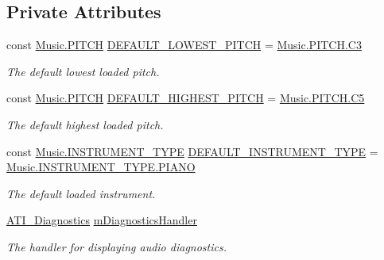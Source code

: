 \subsection*{Private Attributes}
\begin{DoxyCompactItemize}
\item 
const \hyperlink{group___music_enums_ga508f69b199ea518f935486c990edac1d}{Music.\+P\+I\+T\+CH} \hyperlink{group___v_i_m_const_ga0ae09555ae6bc8a04110599510a0d77d}{D\+E\+F\+A\+U\+L\+T\+\_\+\+L\+O\+W\+E\+S\+T\+\_\+\+P\+I\+T\+CH} = \hyperlink{group___music_enums_gga508f69b199ea518f935486c990edac1da3abe124ecc82bf2c2e22e6058f38c50c}{Music.\+P\+I\+T\+C\+H.\+C3}
\begin{DoxyCompactList}\small\item\em The default lowest loaded pitch. \end{DoxyCompactList}\item 
const \hyperlink{group___music_enums_ga508f69b199ea518f935486c990edac1d}{Music.\+P\+I\+T\+CH} \hyperlink{group___v_i_m_const_gadb93993bf989a9ac6e95be9e1561a5bb}{D\+E\+F\+A\+U\+L\+T\+\_\+\+H\+I\+G\+H\+E\+S\+T\+\_\+\+P\+I\+T\+CH} = \hyperlink{group___music_enums_gga508f69b199ea518f935486c990edac1dafea813d4ddba3c46cf8b8e664b92cdaa}{Music.\+P\+I\+T\+C\+H.\+C5}
\begin{DoxyCompactList}\small\item\em The default highest loaded pitch. \end{DoxyCompactList}\item 
const \hyperlink{group___music_enums_gabfce60192305965558a36e368ebd67c3}{Music.\+I\+N\+S\+T\+R\+U\+M\+E\+N\+T\+\_\+\+T\+Y\+PE} \hyperlink{group___v_i_m_const_gad74e35b317d6cc0bb57a78117fa430e6}{D\+E\+F\+A\+U\+L\+T\+\_\+\+I\+N\+S\+T\+R\+U\+M\+E\+N\+T\+\_\+\+T\+Y\+PE} = \hyperlink{group___music_enums_ggabfce60192305965558a36e368ebd67c3aef6dcf375679288e8fe520ec07f29130}{Music.\+I\+N\+S\+T\+R\+U\+M\+E\+N\+T\+\_\+\+T\+Y\+P\+E.\+P\+I\+A\+NO}
\begin{DoxyCompactList}\small\item\em The default loaded instrument. \end{DoxyCompactList}\item 
\hyperlink{group___audio_testing_class_a_t_i___diagnostics}{A\+T\+I\+\_\+\+Diagnostics} \hyperlink{group___v_i_m_priv_gafabe4a874fc21f7bcedf431df3b94201}{m\+Diagnostics\+Handler}
\begin{DoxyCompactList}\small\item\em The handler for displaying audio diagnostics. \end{DoxyCompactList}\item 

\end{DoxyCompactItemize}
